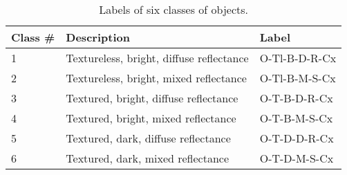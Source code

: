 \begin{table}[!htbp]
\centering
\begin{tabular}{ll|l}
\toprule
Class \# & Description & Label\\
\midrule
1 & Textureless, bright, diffuse reflectance & O-Tl-B-D-R-Cx\\
2 & Textureless, bright, mixed reflectance & O-Tl-B-M-S-Cx\\
3 & Textured, bright, diffuse reflectance & O-T-B-D-R-Cx\\
4 & Textured, bright, mixed reflectance & O-T-B-M-S-Cx\\
5 & Textured, dark, diffuse reflectance & O-T-D-D-R-Cx\\
6 & Textured, dark, mixed reflectance & O-T-D-M-S-Cx\\
\bottomrule
\end{tabular}
\caption{Labels of six classes of objects.}
\label{tab:six_obj_class}
\end{table}

